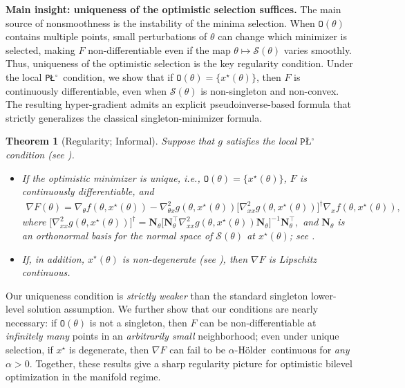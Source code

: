 \documentclass{article}
\theoremstyle{normaltheorem}
\newtheorem*{theorem*}{Theorem}
\newcommand{\hyperobjective}{F}
\newcommand{\PLcirc}{\texttt{P\L$^\circ$}}
\newcommand{\calS}{\mathcal{S}}
\newcommand{\holder}{{H\"older}}
\newcommand{\selectedminimizerset}{{\texttt{O}}}
\begin{document}
\textbf{Main insight: uniqueness of the optimistic selection suffices.}
The main source of nonsmoothness is the instability of the minima selection. When $\selectedminimizerset(\theta)$ contains multiple points, small perturbations of $\theta$ can change which minimizer is selected, making $F$ non-differentiable even if the map $\theta\mapsto\calS(\theta)$ varies smoothly. Thus, uniqueness of the optimistic selection is the key regularity condition.
Under the local \PLcirc\ condition, we show that if $\selectedminimizerset(\theta)=\{x^\star(\theta)\}$, then $F$ is continuously differentiable, even when $\calS(\theta)$ is non-singleton and non-convex. The resulting hyper-gradient admits an explicit pseudoinverse-based formula that strictly generalizes the classical singleton-minimizer formula.
\begin{theorem*}[Regularity; Informal]\label{thm:diff_F}
    Suppose that $g$ satisfies the local \(\PLcirc\) condition (see ).
    \begin{itemize}[leftmargin=*]
        \item If the optimistic minimizer is unique, i.e., $\selectedminimizerset(\theta)=\{x^\star(\theta)\}$, $F$ is continuously differentiable, and
        \begin{align}\label{eq:hg_formula}
            \nabla F(\theta)
            =
            \nabla_{\theta}f(\theta,x^\star(\theta))
            -
            \nabla^{2}_{\theta x}g(\theta,x^\star(\theta))
            \big[\nabla^{2}_{xx}g(\theta,x^\star(\theta))\big]^{\dagger}
            \nabla_{x}f(\theta,x^\star(\theta)),
        \end{align}
        where
$\big[\nabla^{2}_{xx}g(\theta,x^\star(\theta))\big]^{\dagger} = \mathbf{N}_\theta \big[ \mathbf{N}_\theta^\top \nabla^{2}_{xx}g(\theta,x^\star(\theta)) \mathbf{N}_\theta \big]^{-1} \mathbf{N}_\theta^\top,$
and \(\mathbf{N}_\theta\) is an orthonormal basis for the normal space of \(\calS(\theta)\) at \(x^\star(\theta)\); see .

        \item If, in addition, $x^\star(\theta)$ is non-degenerate (see ), then $\nabla\hyperobjective$ is Lipschitz continuous.
    \end{itemize}
\end{theorem*}

Our uniqueness condition is \emph{strictly weaker} than the standard singleton lower-level solution assumption. We further show that our conditions are nearly necessary: if $\selectedminimizerset(\theta)$ is not a singleton, then $F$ can be non-differentiable at \emph{infinitely many} points in an \emph{arbitrarily small} neighborhood; even under unique selection, if $x^\star$ is degenerate, then $\nabla\hyperobjective$ can fail to be $\alpha$-\holder\ continuous for \emph{any} $\alpha>0$. Together, these results give a sharp regularity picture for optimistic bilevel optimization in the manifold regime.
\end{document}
